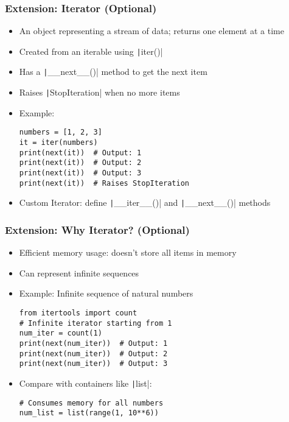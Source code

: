 \documentclass{beamer}
\begin{document}
\begin{frame}[fragile]
    \frametitle{Extension: Iterator (Optional)}
    \begin{itemize}
        \item An object representing a stream of data; returns one element at a time
        \item Created from an iterable using \texttt|iter()|
        \item Has a \texttt|__next__()| method to get the next item
        \item Raises \texttt|StopIteration| when no more items
        \item Example:
              \begin{verbatim}
numbers = [1, 2, 3]
it = iter(numbers)
print(next(it))  # Output: 1
print(next(it))  # Output: 2
print(next(it))  # Output: 3
print(next(it))  # Raises StopIteration
              \end{verbatim}
        \item Custom Iterator: define \texttt|__iter__()| and \texttt|__next__()| methods
    \end{itemize}
\end{frame}

\begin{frame}[fragile]
    \frametitle{Extension: Why Iterator? (Optional)}
    \begin{itemize}
        \item Efficient memory usage: doesn't store all items in memory
        \item Can represent infinite sequences
        \item Example: Infinite sequence of natural numbers
              \begin{verbatim}
from itertools import count
# Infinite iterator starting from 1
num_iter = count(1)
print(next(num_iter))  # Output: 1
print(next(num_iter))  # Output: 2
print(next(num_iter))  # Output: 3
              \end{verbatim}
        \item Compare with containers like \texttt|list|:
              \begin{verbatim}
# Consumes memory for all numbers
num_list = list(range(1, 10**6))
              \end{verbatim}
    \end{itemize}
\end{frame}
\end{document}

